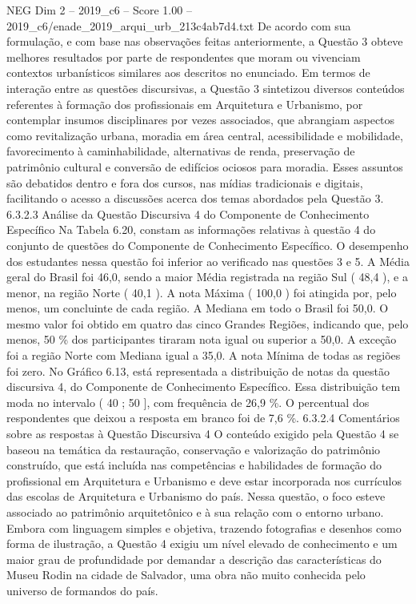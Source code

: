 \begin{textsample}{NEG Dim 2 – 2019\_c6 – Score 1.00 – 2019\_c6/enade\_2019\_arqui\_urb\_213c4ab7d4.txt}
De acordo com sua formulação, e com base nas observações feitas anteriormente, a Questão 3 obteve melhores resultados por parte de respondentes que moram ou vivenciam contextos urbanísticos similares aos descritos no enunciado.
Em termos de interação entre as questões discursivas, a Questão 3 sintetizou diversos conteúdos referentes à formação dos profissionais em Arquitetura e Urbanismo, por contemplar insumos disciplinares por vezes associados, que abrangiam aspectos como revitalização urbana, moradia em área central, acessibilidade e mobilidade, favorecimento à caminhabilidade, alternativas de renda, preservação de patrimônio cultural e conversão de edifícios ociosos para moradia.
Esses assuntos são debatidos dentro e fora dos cursos, nas mídias tradicionais e digitais, facilitando o acesso a discussões acerca dos temas abordados pela Questão 3. 6.3.2.3 Análise da Questão Discursiva 4 do Componente de Conhecimento Específico Na Tabela 6.20, constam as informações relativas à questão 4 do conjunto de questões do Componente de Conhecimento Específico.
O desempenho dos estudantes nessa questão foi inferior ao verificado nas questões 3 e 5.
A Média geral do Brasil foi 46,0, sendo a maior Média registrada na região Sul ( 48,4 ), e a menor, na região Norte ( 40,1 ).
A nota Máxima ( 100,0 ) foi atingida por, pelo menos, um concluinte de cada região.
A Mediana em todo o Brasil foi 50,0.
O mesmo valor foi obtido em quatro das cinco Grandes Regiões, indicando que, pelo menos, 50 \% dos participantes tiraram nota igual ou superior a 50,0.
A exceção foi a região Norte com Mediana igual a 35,0.
A nota Mínima de todas as regiões foi zero.
No Gráfico 6.13, está representada a distribuição de notas da questão discursiva 4, do Componente de Conhecimento Específico.
Essa distribuição tem moda no intervalo ( 40 ; 50 ], com frequência de 26,9 \%.
O percentual dos respondentes que deixou a resposta em branco foi de 7,6 \%. 6.3.2.4 Comentários sobre as respostas à Questão Discursiva 4 O conteúdo exigido pela Questão 4 se baseou na temática da restauração, conservação e valorização do patrimônio construído, que está incluída nas competências e habilidades de formação do profissional em Arquitetura e Urbanismo e deve estar incorporada nos currículos das escolas de Arquitetura e Urbanismo do país.
Nessa questão, o foco esteve associado ao patrimônio arquitetônico e à sua relação com o entorno urbano.
Embora com linguagem simples e objetiva, trazendo fotografias e desenhos como forma de ilustração, a Questão 4 exigiu um nível elevado de conhecimento e um maior grau de profundidade por demandar a descrição das características do Museu Rodin na cidade de Salvador, uma obra não muito conhecida pelo universo de formandos do país.

\end{textsample}
